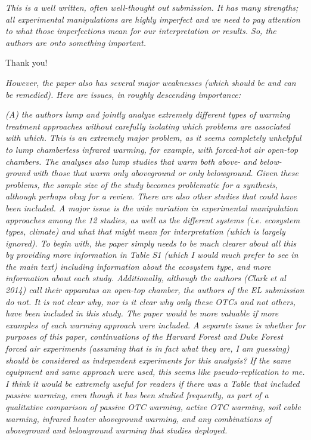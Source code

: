 \documentclass[11pt,a4paper]{letter}
\begin{document}
\begin{letter}{}
\emph{This is a well written, often well-thought out submission. It has many strengths; all experimental manipulations are highly imperfect and we need to pay attention to what those imperfections mean for our interpretation or results. So, the authors are onto something important.}

\par Thank you!

\emph{However, the paper also has several major weaknesses (which should be and can be remedied). Here are issues, in roughly descending importance:}

\emph{(A) the authors lump and jointly analyze extremely different types of warming treatment approaches without carefully isolating which problems are associated with which. This is an extremely major problem, as it seems completely unhelpful to lump chamberless infrared warming, for example, with forced-hot air open-top chambers. The analyses also lump studies that warm both above- and below-ground with those that warm only aboveground or only belowground. Given these problems, the sample size of the study becomes problematic for a synthesis, although perhaps okay for a review. There are also other studies that could have been included. A major issue is the wide variation in experimental manipulation approaches among the 12 studies, as well as the different systems (i.e. ecosystem types, climate) and what that might mean for interpretation (which is largely ignored). To begin with, the paper simply needs to be much clearer about all this by providing more information in Table S1 (which I would much prefer to see in the main text) including information about the ecosystem type, and more information about each study. Additionally, although the authors (Clark et al 2014) call their apparatus an open-top chamber, the authors of the EL submission do not. It is not clear why, nor is it clear why only these OTCs and not others, have been included in this study. The paper would be more valuable if more examples of each warming approach were included. A separate issue is whether for purposes of this paper, continuations of the Harvard Forest and Duke Forest forced air experiments (assuming that is in fact what they are, I am guessing) should be considered as independent experiments for this analysis? If the same equipment and same approach were used, this seems like pseudo-replication to me. I think it would be extremely useful for readers if there was a Table that included passive warming, even though it has been studied frequently, as part of a qualitative comparison of passive OTC warming, active OTC warming, soil cable warming, infrared heater aboveground warming, and any combinations of aboveground and belowground warming that studies deployed.}


\end{letter}
\end{document}
